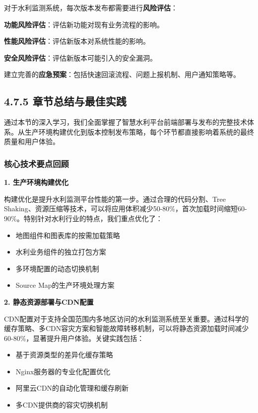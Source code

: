 对于水利监测系统，每次版本发布都需要进行\textbf{风险评估}：

\textbf{功能风险评估}：评估新功能对现有业务流程的影响。

\textbf{性能风险评估}：评估新版本对系统性能的影响。

\textbf{安全风险评估}：评估新版本可能引入的安全漏洞。

建立完善的\textbf{应急预案}：包括快速回滚流程、问题上报机制、用户通知策略等。

\subsection{4.7.5 章节总结与最佳实践}\label{ux7ae0ux8282ux603bux7ed3ux4e0eux6700ux4f73ux5b9eux8df5}

通过本节的深入学习，我们全面掌握了智慧水利平台前端部署与发布的完整技术体系。从生产环境构建优化到版本控制发布策略，每个环节都直接影响着系统的最终质量和用户体验。

\subsubsection{核心技术要点回顾}\label{ux6838ux5fc3ux6280ux672fux8981ux70b9ux56deux987e}

\textbf{1. 生产环境构建优化}

构建优化是提升水利监测平台性能的第一步。通过合理的代码分割、Tree Shaking、资源压缩等技术，可以将应用体积减少50-80\%，首次加载时间缩短60-90\%。特别针对水利行业的特点，我们重点优化了：

\begin{itemize}
\tightlist
\item
  地图组件和图表库的按需加载策略
\item
  水利业务组件的独立打包方案
\item
  多环境配置的动态切换机制
\item
  Source Map的生产环境处理方案
\end{itemize}

\textbf{2. 静态资源部署与CDN配置}

CDN配置对于支持全国范围内多地区访问的水利监测系统至关重要。通过科学的缓存策略、多CDN容灾方案和智能故障转移机制，可以将静态资源加载时间减少60-80\%，显著提升用户体验。关键实践包括：

\begin{itemize}
\tightlist
\item
  基于资源类型的差异化缓存策略
\item
  Nginx服务器的专业化配置优化
\item
  阿里云CDN的自动化管理和缓存刷新
\item
  多CDN提供商的容灾切换机制
\end{itemize}

